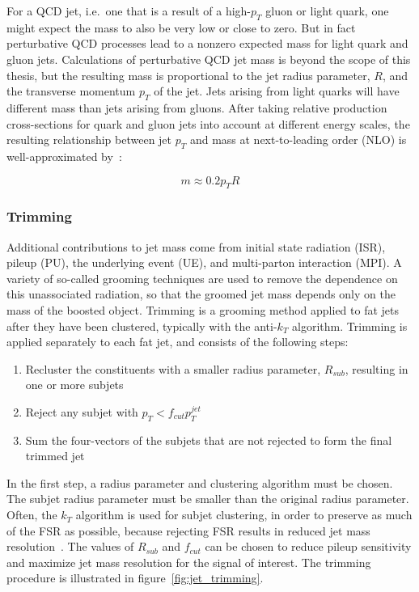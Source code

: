 For a QCD jet, i.e.\ one that is a result of a high-$p_T$ gluon or light quark, one might expect the mass to also be very low or close to zero.
But in fact perturbative QCD processes lead to a nonzero expected mass for light quark and gluon jets.
Calculations of perturbative QCD jet mass is beyond the scope of this thesis,
but the resulting mass is proportional to the jet radius parameter, $R$, and the transverse momentum $p_T$ of the jet.
Jets arising from light quarks will have different mass than jets arising from gluons.
After taking relative production cross-sections for quark and gluon jets into account at different energy scales,
the resulting relationship between jet $p_T$ and mass at next-to-leading order (NLO) is well-approximated by~\cite{jet-mass-nlo}:

\begin{equation}\label{eq:jet_mass_nlo}
    m \approx 0.2 p_T R
\end{equation}

\subsubsection{Trimming}

Additional contributions to jet mass come from initial state radiation (ISR), pileup (PU), the underlying event (UE), and multi-parton interaction (MPI).
A variety of so-called grooming techniques are used to remove the dependence on this unassociated radiation, so that the groomed jet mass depends only on the mass of the boosted object.
Trimming is a grooming method applied to fat jets after they have been clustered, typically with the anti-$k_T$ algorithm.
Trimming is applied separately to each fat jet, and consists of the following steps:

\begin{enumerate}
    \item Recluster the constituents with a smaller radius parameter, $R_{sub}$, resulting in one or more subjets
    \item Reject any subjet with $p_{T} < f_{cut} p_T^{jet}$
    \item Sum the four-vectors of the subjets that are not rejected to form the final trimmed jet
\end{enumerate}

In the first step, a radius parameter and clustering algorithm must be chosen.
The subjet radius parameter must be smaller than the original radius parameter.
Often, the $k_T$ algorithm is used for subjet clustering, in order to preserve as much of the FSR as possible, because rejecting FSR results in reduced jet mass resolution~\cite{jet-tasi-substructure}.
The values of $R_{sub}$ and $f_{cut}$ can be chosen to reduce pileup sensitivity and maximize jet mass resolution for the signal of interest.
The trimming procedure is illustrated in figure~\ref{fig:jet_trimming}.

